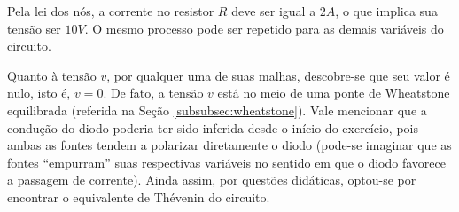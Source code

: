 \documentclass{article}
\numberwithin{equation}{section}
\begin{document}
\begin{center}
\end{center}

\noindent Pela lei dos nós, a corrente no resistor $R$ deve ser igual a $2A$, o que implica sua tensão ser $10V$. O mesmo processo pode ser repetido para as demais variáveis do circuito.

\begin{center}
\end{center}

\noindent Quanto à tensão $v$, por qualquer uma de suas malhas, descobre-se que seu valor é nulo, isto é, $v=0$. De fato, a tensão $v$ está no meio de uma ponte de Wheatstone equilibrada (referida na Seção \ref{subsubsec:wheatstone}). Vale mencionar que a condução do diodo poderia ter sido inferida desde o início do exercício, pois ambas as fontes tendem a polarizar diretamente o diodo (pode-se imaginar que as fontes ``empurram'' suas respectivas variáveis no sentido em que o diodo favorece a passagem de corrente). Ainda assim, por questões didáticas, optou-se por encontrar o equivalente de Thévenin do circuito.
\end{document}
